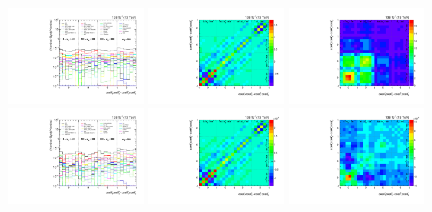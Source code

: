 \begin{figure}[htb]
\begin{center}
 \includegraphics[width=0.32\textwidth]{fig_fullRun2UL/unfolding/combined/deltaSystCombinedlog_rebinnedB_c_Mrk_mttbar.pdf}
 \includegraphics[width=0.32\textwidth]{fig_fullRun2UL/unfolding/combined/StatCovMatrix_rebinnedB_c_Mrk_mttbar.pdf}
 \includegraphics[width=0.32\textwidth]{fig_fullRun2UL/unfolding/combined/TotalSystCovMatrix_rebinnedB_c_Mrk_mttbar.pdf} \\
 \includegraphics[width=0.32\textwidth]{fig_fullRun2UL/unfolding/combined/deltaSystCombinedlogNorm_rebinnedB_c_Mrk_mttbar.pdf}
 \includegraphics[width=0.32\textwidth]{fig_fullRun2UL/unfolding/combined/StatCovMatrixNorm_rebinnedB_c_Mrk_mttbar.pdf}
 \includegraphics[width=0.32\textwidth]{fig_fullRun2UL/unfolding/combined/TotalSystCovMatrixNorm_rebinnedB_c_Mrk_mttbar.pdf} \\

\end{center}
\end{figure}
